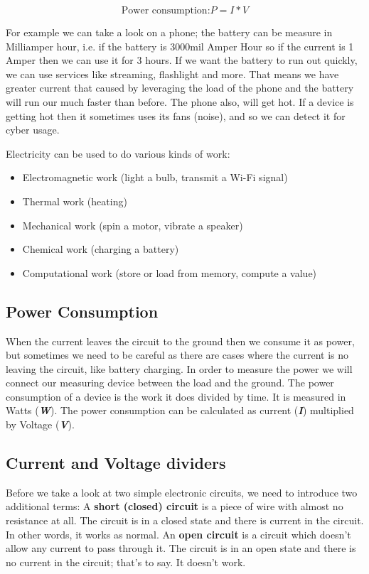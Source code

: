 \begin{displaymath}\label{eq:power_consumption}
    \textrm{Power consumption:} P=I*V
\end{displaymath}

For example we can take a look on a phone; the battery can be measure in
Milliamper hour, i.e. if the battery is 3000mil Amper Hour so if the current is
1 Amper then we can use it for 3 hours. If we want the battery to run out
quickly, we can use services like streaming, flashlight and more. That means we
have greater current that caused by leveraging the load of the phone and the
battery will run our much faster than before. The phone also, will get hot. If a
device is getting hot then it sometimes uses its fans (noise), and so we can
detect it for cyber usage.

Electricity can be used to do various kinds of work:
\begin{itemize}
    \item Electromagnetic work (light a bulb, transmit a Wi-Fi signal)
    \item Thermal work (heating)
    \item Mechanical work (spin a motor, vibrate a speaker)
    \item Chemical work (charging a battery)
    \item Computational work (store or load from memory, compute a value)
\end{itemize}

\subsection{Power Consumption}

When the current leaves the circuit to the ground then we consume it as power,
but sometimes we need to be careful as there are cases where the current is no
leaving the circuit, like battery charging. In order to measure the power we
will connect our measuring device between the load and the ground. The power
consumption of a device is the work it does divided by time. It is measured in
Watts (\textbf{\textit{W}}). The power consumption can be calculated as current
(\textbf{\textit{I}}) multiplied by Voltage (\textbf{\textit{V}}).

\subsection{Current and Voltage dividers}

Before we take a look at two simple electronic circuits, we need to introduce
two additional terms: A \textbf{short (closed) circuit} is a piece of wire with
almost no resistance at all. The circuit is in a closed state and there is
current in the circuit. In other words, it works as normal. An \textbf{open
circuit} is a circuit which doesn't allow any current to pass through it. The
circuit is in an open state and there is no current in the circuit; that's to
say. It doesn't work.

